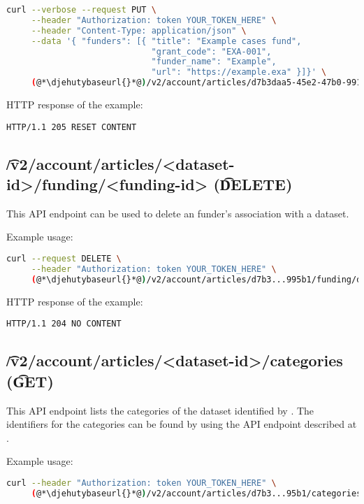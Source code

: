 \begin{lstlisting}[language=bash]
curl --verbose --request PUT \
     --header "Authorization: token YOUR_TOKEN_HERE" \
     --header "Content-Type: application/json" \
     --data '{ "funders": [{ "title": "Example cases fund",
                             "grant_code": "EXA-001",
                             "funder_name": "Example",
                             "url": "https://example.exa" }]}' \
     (@*\djehutybaseurl{}*@)/v2/account/articles/d7b3daa5-45e2-47b0-9910-0f7fa6a995b1/funding
\end{lstlisting}

  HTTP response of the example:
\begin{lstlisting}
HTTP/1.1 205 RESET CONTENT
\end{lstlisting}

\subsection{\t{/v2/account/articles/<dataset-id>/funding/<funding-id>} (\t{DELETE})}

  This API endpoint can be used to delete an funder's association with a dataset.

  Example usage:
\begin{lstlisting}[language=bash]
curl --request DELETE \
     --header "Authorization: token YOUR_TOKEN_HERE" \
     (@*\djehutybaseurl{}*@)/v2/account/articles/d7b3...995b1/funding/d50e...7500
\end{lstlisting}

  HTTP response of the example:
\begin{lstlisting}
HTTP/1.1 204 NO CONTENT
\end{lstlisting}

\subsection{\t{/v2/account/articles/<dataset-id>/categories} (\t{GET})}

  This API endpoint lists the categories of the dataset identified by .
  The identifiers for the categories can be found by using the API endpoint
  described at .

  Example usage:
\begin{lstlisting}[language=bash]
curl --header "Authorization: token YOUR_TOKEN_HERE" \
     (@*\djehutybaseurl{}*@)/v2/account/articles/d7b3...95b1/categories | jq
\end{lstlisting}

